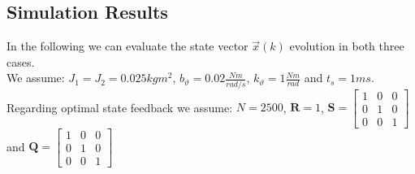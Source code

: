 \documentclass[11pt,a4paper,oneside]{book}
\numberwithin{equation}{section}
\theoremstyle{it}
\theoremstyle{definition}
\begin{document}
\subsection{Simulation Results}
In the following we can evaluate the state vector $\vec{x}(k)$ evolution in 
both three cases.\\
We assume: $J_1 = J_2 = 0.025kgm^2$, $b_{\vartheta} = 0.02\frac{Nm}{rad/s}$, 
$k_{\vartheta} = 1\frac{Nm}{rad}$ and $t_s=1ms$. \\
Regarding optimal state feedback we assume:  $N=2500$, $\mathbf{R}=1$, 
$\mathbf{S}=\begin{bmatrix} 1&0&0\\0&1&0\\0&0&1 \end{bmatrix}$ and 
$\mathbf{Q}=\begin{bmatrix} 1&0&0\\0&1&0\\0&0&1 \end{bmatrix}$
\end{document}
